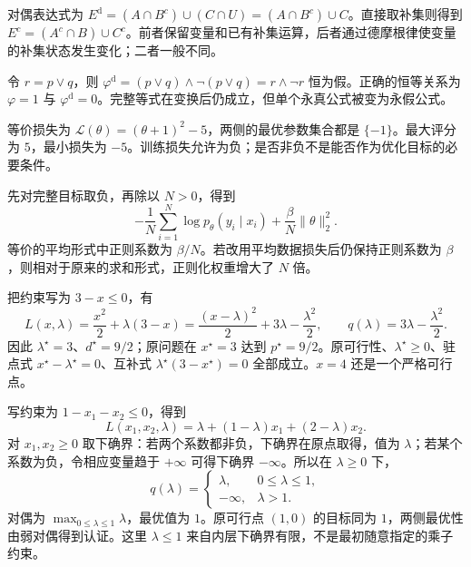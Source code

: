 \documentclass[UTF8]{ctexart}
\begin{document}
\begin{solve}
对偶表达式为 $E^{\mathrm d}=(A\cap B^c)\cup(C\cap U)= (A\cap B^c)\cup C$。直接取补集则得到 $E^c=(A^c\cap B)\cup C^c$。前者保留变量和已有补集运算，后者通过德摩根律使变量的补集状态发生变化；二者一般不同。
\end{solve}

\begin{solve}
令 $r=p\lor q$，则 $\varphi^{\mathrm d}=(p\lor q)\land\neg(p\lor q)=r\land\neg r$ 恒为假。正确的恒等关系为 $\varphi=1$ 与 $\varphi^{\mathrm d}=0$。完整等式在变换后仍成立，但单个永真公式被变为永假公式。
\end{solve}

\begin{solve}
等价损失为 $\mathcal L(\theta)=(\theta+1)^2-5$，两侧的最优参数集合都是 $\{-1\}$。最大评分为 $5$，最小损失为 $-5$。训练损失允许为负；是否非负不是能否作为优化目标的必要条件。
\end{solve}

\begin{solve}
先对完整目标取负，再除以 $N>0$，得到
\[
 -\frac1N\sum_{i=1}^N\log p_\theta(y_i\mid x_i)
 +\frac\beta N\|\theta\|_2^2.
\]
等价的平均形式中正则系数为 $\beta/N$。若改用平均数据损失后仍保持正则系数为 $\beta$，则相对于原来的求和形式，正则化权重增大了 $N$ 倍。
\end{solve}

\begin{solve}
把约束写为 $3-x\leq0$，有
\[
 L(x,\lambda)=\frac{x^2}{2}+\lambda(3-x)
 =\frac{(x-\lambda)^2}{2}+3\lambda-\frac{\lambda^2}{2},
 \qquad q(\lambda)=3\lambda-\frac{\lambda^2}{2}.
\]
因此 $\lambda^\star=3$、$d^\star=9/2$；原问题在 $x^\star=3$ 达到 $p^\star=9/2$。原可行性、$\lambda^\star\geq0$、驻点式 $x^\star-\lambda^\star=0$、互补式 $\lambda^\star(3-x^\star)=0$ 全部成立。$x=4$ 还是一个严格可行点。
\end{solve}

\begin{solve}
写约束为 $1-x_1-x_2\leq0$，得到
\[
 L(x_1,x_2,\lambda)
 =\lambda+(1-\lambda)x_1+(2-\lambda)x_2.
\]
对 $x_1,x_2\geq0$ 取下确界：若两个系数都非负，下确界在原点取得，值为 $\lambda$；若某个系数为负，令相应变量趋于 $+\infty$ 可得下确界 $-\infty$。所以在 $\lambda\geq0$ 下，
\[
 q(\lambda)=
 \begin{cases}
 \lambda,&0\leq\lambda\leq1,\\
 -\infty,&\lambda>1.
 \end{cases}
\]
对偶为 $\max_{0\leq\lambda\leq1}\lambda$，最优值为 $1$。原可行点 $(1,0)$ 的目标同为 $1$，两侧最优性由弱对偶得到认证。这里 $\lambda\leq1$ 来自内层下确界有限，不是最初随意指定的乘子约束。
\end{solve}
\end{document}
